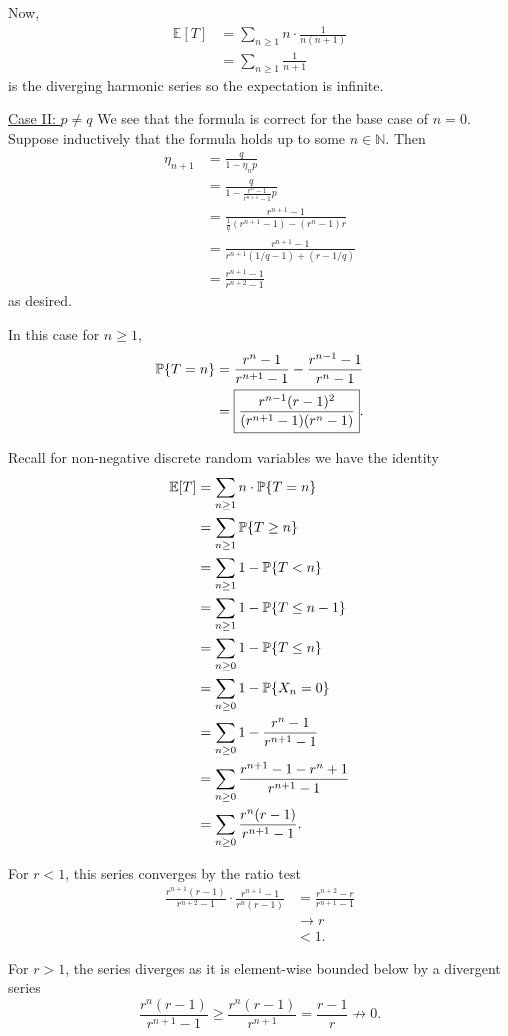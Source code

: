 \documentclass[10pt]{article}
\DeclarePairedDelimiter{\set}{\lbrace}{\rbrace}
\newcommand{\E}{\mathbb{E}}
\newcommand{\N}{\mathbb{N}}
\renewcommand{\P}{\mathbb{P}}
\begin{document}
Now,
\begin{align*}
  \E[T]
  &= \sum_{n\geq 1} n\cdot \frac1{n(n+1)} \\
  &= \sum_{n\geq 1} \frac1{n+1}
\end{align*}
is the diverging harmonic series so the expectation is infinite.

\underline{Case II: $p\neq q$}
We see that the formula is correct for the base case of $n=0$.
Suppose inductively that the formula holds up to some $n\in \N$.
Then
\begin{align*}
  \eta_{n+1}
  &= \frac{q}{1-\eta_n p} \\
  &= \frac{q}{1- \frac{r^n-1}{r^{n+1}-1} p} \\
  &= \frac{r^{n+1}-1}{\frac1q (r^{n+1}-1) - (r^n-1)r} \\
  &= \frac{r^{n+1}-1}{r^{n+1} (1/q-1) + (r-1/q)} \\
  &= \frac{r^{n+1}-1}{r^{n+2}-1}
\end{align*}
as desired.

In this case for $n\geq 1$,
\begin{align*}
  \P\set{T=n}
  &= \frac{r^n-1}{r^{n+1}-1} - \frac{r^{n-1}-1}{r^{n}-1} \\
  &= \boxed{\frac{r^{n-1} (r-1)^2}{(r^{n+1}-1)(r^n-1)}}.
\end{align*}

Recall for non-negative discrete random variables
we have the identity
\begin{align*}
  \E[T]
  &= \sum_{n\geq 1} n\cdot \P\set{T=n} \\
  &= \sum_{n\geq 1} \P\set{T\geq n} \\
  &= \sum_{n\geq 1} 1- \P\set{T<n} \\
  &= \sum_{n\geq 1} 1- \P\set{T\leq n-1} \\
  &= \sum_{n\geq 0} 1- \P\set{T\leq n} \\
  &= \sum_{n\geq 0} 1- \P\set{X_n = 0} \\
  &= \sum_{n\geq 0} 1 - \frac{r^{n} - 1}{r^{n+1}-1} \\
  &= \sum_{n\geq 0} \frac{r^{n+1} - 1 - r^{n} + 1}{r^{n+1}-1} \\
  &= \sum_{n\geq 0} \frac{r^n(r - 1)}{r^{n+1}-1}.
\end{align*}

For $r < 1$,
this series converges by the ratio test
\begin{align*}
  \frac{r^{n+1}(r-1)}{r^{n+2}-1}\cdot \frac{r^{n+1}-1}{r^n (r-1)}
  &= \frac{r^{n+2} - r}{r^{n+1}-1} \\
  &\to r \\
  &< 1.
\end{align*}

For $r > 1$,
the series diverges as it is element-wise bounded below by a divergent series
\[
  \frac{r^n (r-1)}{r^{n+1} - 1}
  \geq \frac{r^n (r-1)}{r^{n+1}}
  = \frac{r-1}{r}
  \not\to 0.
\]

\clearpage
\section{}
\end{document}
